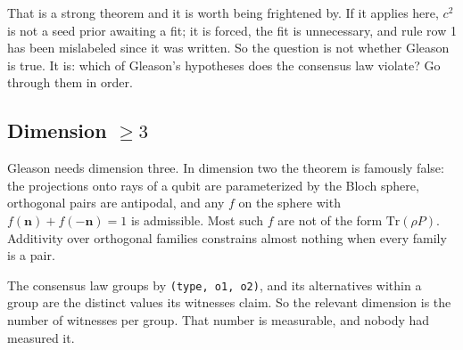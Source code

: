 That is a strong theorem and it is worth being frightened by. If it applies here, $c^2$ is not a seed prior awaiting a fit; it is forced, the fit is unnecessary, and rule row 1 has been mislabeled since it was written. So the question is not whether Gleason is true. It is: which of Gleason's hypotheses does the consensus law violate? Go through them in order.

\subsection{Dimension $\geq 3$}

Gleason needs dimension three. In dimension two the theorem is famously false: the projections onto rays of a qubit are parameterized by the Bloch sphere, orthogonal pairs are antipodal, and any $f$ on the sphere with $f(\mathbf{n}) + f(-\mathbf{n}) = 1$ is admissible. Most such $f$ are not of the form $\mathrm{Tr}(\rho P)$. Additivity over orthogonal families constrains almost nothing when every family is a pair.

The consensus law groups by \texttt{(type, o1, o2)}, and its alternatives within a group are the distinct values its witnesses claim. So the relevant dimension is the number of witnesses per group. That number is measurable, and nobody had measured it.

